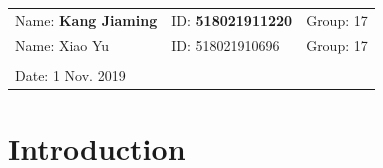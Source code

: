 \documentclass{article}
\begin{document}
\vspace*{0.25cm}

\noindent\hrulefill

\thispagestyle{empty}

\begin{center}
    \begin{large}
    \end{large}

    \hrulefill

    \vspace*{5cm}
    \begin{Large}
    \end{Large}

    \vspace{2em}

    \begin{large}
    \end{large}
\end{center}
\vfill

\begin{table}[h!]
    \flushleft
    \begin{tabular}{lll}
        Name: \textbf{Kang Jiaming} \hspace*{2em} &
        ID: \textbf{518021911220} \hspace*{2em}
                                                  & Group: 17 \\
        Name: Xiao Yu \hspace*{2em}               &
        ID: 518021910696 \hspace*{2em}
                                                  & Group: 17 \\
        \\

        Date: 1 Nov. 2019
    \end{tabular}
\end{table}

\hfill
\newpage
\tableofcontents
\setcounter{page}{0}
\thispagestyle{empty}
\newpage

\section{Introduction} \label{intro}
\end{document}
